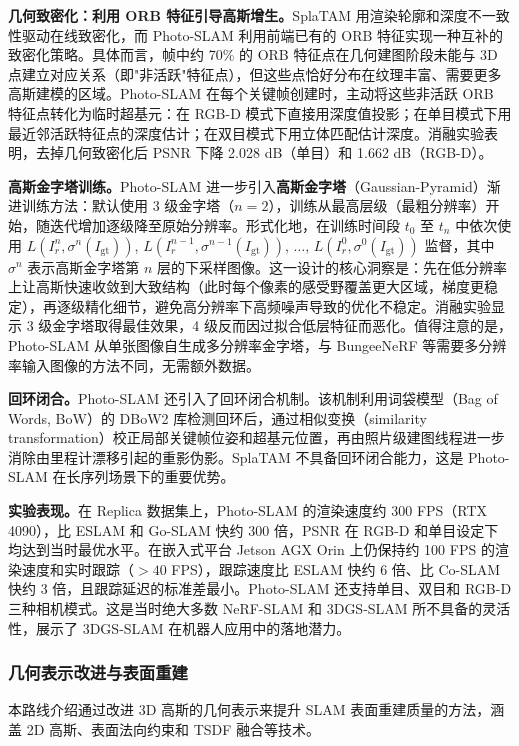 \textbf{几何致密化：利用 ORB 特征引导高斯增生。}SplaTAM 用渲染轮廓和深度不一致性驱动在线致密化，而 Photo-SLAM 利用前端已有的 ORB 特征实现一种互补的致密化策略。具体而言，帧中约 70\% 的 ORB 特征点在几何建图阶段未能与 3D 点建立对应关系（即"非活跃"特征点），但这些点恰好分布在纹理丰富、需要更多高斯建模的区域。Photo-SLAM 在每个关键帧创建时，主动将这些非活跃 ORB 特征点转化为临时超基元：在 RGB-D 模式下直接用深度值投影；在单目模式下用最近邻活跃特征点的深度估计；在双目模式下用立体匹配估计深度。消融实验表明，去掉几何致密化后 PSNR 下降 2.028 dB（单目）和 1.662 dB（RGB-D）。

\textbf{高斯金字塔训练。}Photo-SLAM 进一步引入\textbf{高斯金字塔}（Gaussian-Pyramid）渐进训练方法：默认使用 3 级金字塔（$n=2$），训练从最高层级（最粗分辨率）开始，随迭代增加逐级降至原始分辨率。形式化地，在训练时间段 $t_0$ 至 $t_n$ 中依次使用 $L(I^{n}_r, \sigma^n(I_{\text{gt}}))$, $L(I^{n-1}_r, \sigma^{n-1}(I_{\text{gt}}))$, $\ldots$, $L(I^{0}_r, \sigma^{0}(I_{\text{gt}}))$ 监督，其中 $\sigma^n$ 表示高斯金字塔第 $n$ 层的下采样图像。这一设计的核心洞察是：先在低分辨率上让高斯快速收敛到大致结构（此时每个像素的感受野覆盖更大区域，梯度更稳定），再逐级精化细节，避免高分辨率下高频噪声导致的优化不稳定。消融实验显示 3 级金字塔取得最佳效果，4 级反而因过拟合低层特征而恶化。值得注意的是，Photo-SLAM 从单张图像自生成多分辨率金字塔，与 BungeeNeRF 等需要多分辨率输入图像的方法不同，无需额外数据。

\textbf{回环闭合。}Photo-SLAM 还引入了回环闭合机制。该机制利用词袋模型（Bag of Words, BoW）的 DBoW2 库检测回环后，通过相似变换（similarity transformation）校正局部关键帧位姿和超基元位置，再由照片级建图线程进一步消除由里程计漂移引起的重影伪影。SplaTAM 不具备回环闭合能力，这是 Photo-SLAM 在长序列场景下的重要优势。

\textbf{实验表现。}在 Replica 数据集上，Photo-SLAM 的渲染速度约 300 FPS（RTX 4090），比 ESLAM 和 Go-SLAM 快约 300 倍，PSNR 在 RGB-D 和单目设定下均达到当时最优水平。在嵌入式平台 Jetson AGX Orin 上仍保持约 100 FPS 的渲染速度和实时跟踪（$>40$ FPS），跟踪速度比 ESLAM 快约 6 倍、比 Co-SLAM 快约 3 倍，且跟踪延迟的标准差最小。Photo-SLAM 还支持单目、双目和 RGB-D 三种相机模式。这是当时绝大多数 NeRF-SLAM 和 3DGS-SLAM 所不具备的灵活性，展示了 3DGS-SLAM 在机器人应用中的落地潜力。

\subsubsection{几何表示改进与表面重建}

本路线介绍通过改进 3D 高斯的几何表示来提升 SLAM 表面重建质量的方法，涵盖 2D 高斯、表面法向约束和 TSDF 融合等技术。

